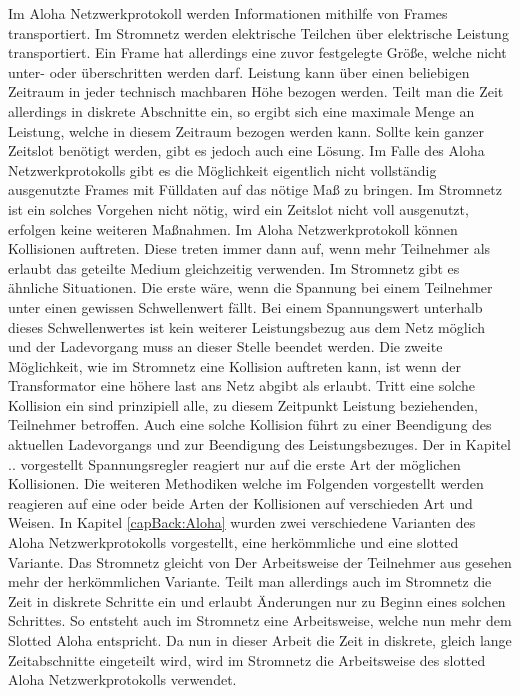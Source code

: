 Im Aloha Netzwerkprotokoll werden Informationen mithilfe von Frames transportiert. Im Stromnetz werden elektrische Teilchen über elektrische Leistung transportiert. Ein Frame hat allerdings eine zuvor festgelegte Größe, welche nicht unter- oder überschritten werden darf. Leistung kann über einen beliebigen Zeitraum in jeder technisch machbaren Höhe bezogen werden. Teilt man die Zeit allerdings in diskrete Abschnitte ein, so ergibt sich eine maximale Menge an Leistung, welche in diesem Zeitraum bezogen werden kann. Sollte kein ganzer Zeitslot benötigt werden, gibt es jedoch auch eine Lösung. Im Falle des Aloha Netzwerkprotokolls gibt es die Möglichkeit eigentlich nicht vollständig ausgenutzte Frames mit Fülldaten auf das nötige Maß zu bringen. Im Stromnetz ist ein solches Vorgehen nicht nötig, wird ein Zeitslot nicht voll ausgenutzt, erfolgen keine weiteren Maßnahmen. Im Aloha Netzwerkprotokoll können Kollisionen auftreten. Diese treten immer dann auf, wenn mehr Teilnehmer als erlaubt das geteilte Medium gleichzeitig verwenden. Im Stromnetz gibt es ähnliche Situationen. Die erste wäre, wenn die Spannung bei einem Teilnehmer unter einen gewissen Schwellenwert fällt. Bei einem Spannungswert unterhalb dieses Schwellenwertes ist kein weiterer Leistungsbezug aus dem Netz möglich und der Ladevorgang muss an dieser Stelle beendet werden. Die zweite Möglichkeit, wie im Stromnetz eine Kollision auftreten kann, ist wenn der Transformator eine höhere last ans Netz abgibt als erlaubt. Tritt eine solche Kollision ein sind prinzipiell alle, zu diesem Zeitpunkt Leistung beziehenden, Teilnehmer betroffen. Auch eine solche Kollision führt zu einer Beendigung des aktuellen Ladevorgangs und zur Beendigung des Leistungsbezuges. Der in Kapitel .. vorgestellt Spannungsregler reagiert nur auf die erste Art der möglichen Kollisionen. Die weiteren Methodiken welche im Folgenden vorgestellt werden reagieren auf eine oder beide Arten der Kollisionen auf verschieden Art und Weisen.
In Kapitel \ref{capBack:Aloha} wurden zwei verschiedene Varianten des Aloha Netzwerkprotokolls vorgestellt, eine herkömmliche und eine slotted Variante. Das Stromnetz gleicht von Der Arbeitsweise der Teilnehmer aus gesehen mehr der herkömmlichen Variante. Teilt man allerdings auch im Stromnetz die Zeit in diskrete Schritte ein und erlaubt Änderungen nur zu Beginn eines solchen Schrittes. So entsteht auch im Stromnetz eine Arbeitsweise, welche nun mehr dem Slotted Aloha entspricht. Da nun in dieser Arbeit die Zeit in diskrete, gleich lange Zeitabschnitte eingeteilt wird, wird im Stromnetz die Arbeitsweise des slotted Aloha Netzwerkprotokolls verwendet.

